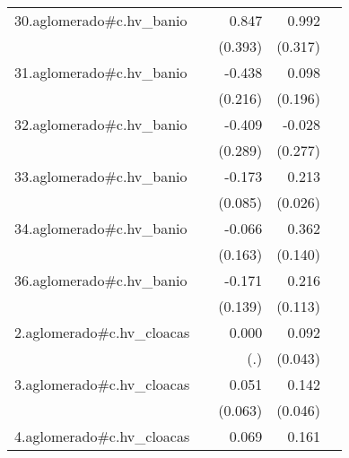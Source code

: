 {\begin{longtable}{l*{4}{D{.}{.}{-1}}}
\addlinespace
30.aglomerado#c.hv\_banio&                     &       0.847\sym{*}  &       0.992\sym{**} &                     \\
            &                     &     (0.393)         &     (0.317)         &                     \\
\addlinespace
31.aglomerado#c.hv\_banio&                     &      -0.438\sym{*}  &       0.098         &                     \\
            &                     &     (0.216)         &     (0.196)         &                     \\
\addlinespace
32.aglomerado#c.hv\_banio&                     &      -0.409         &      -0.028         &                     \\
            &                     &     (0.289)         &     (0.277)         &                     \\
\addlinespace
33.aglomerado#c.hv\_banio&                     &      -0.173\sym{*}  &       0.213\sym{***}&                     \\
            &                     &     (0.085)         &     (0.026)         &                     \\
\addlinespace
34.aglomerado#c.hv\_banio&                     &      -0.066         &       0.362\sym{**} &                     \\
            &                     &     (0.163)         &     (0.140)         &                     \\
\addlinespace
36.aglomerado#c.hv\_banio&                     &      -0.171         &       0.216         &                     \\
            &                     &     (0.139)         &     (0.113)         &                     \\
\addlinespace
2.aglomerado#c.hv\_cloacas&                     &       0.000         &       0.092\sym{*}  &                     \\
            &                     &         (.)         &     (0.043)         &                     \\
\addlinespace
3.aglomerado#c.hv\_cloacas&                     &       0.051         &       0.142\sym{**} &                     \\
            &                     &     (0.063)         &     (0.046)         &                     \\
\addlinespace
4.aglomerado#c.hv\_cloacas&                     &       0.069         &       0.161\sym{***}&                     \\

\end{longtable}}
